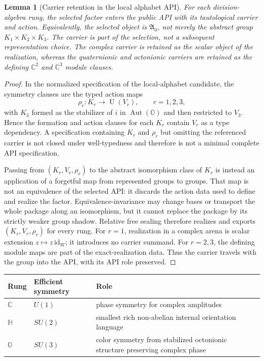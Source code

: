\documentclass[11pt]{article}
\theoremstyle{plain}
\newtheorem{lemma}[theorem]{Lemma}
\theoremstyle{definition}
\theoremstyle{remark}
\newcommand{\Aut}{\operatorname{Aut}}
\newcommand{\C}{\mathbb{C}}
\newcommand{\HH}{\mathbb{H}}
\newcommand{\OO}{\mathbb{O}}
\begin{document}
\begin{lemma}[Carrier retention in the local alphabet API]
For each division-algebra rung, the selected factor enters the public API
with its tautological carrier and action.  Equivalently, the selected object is
\(\mathfrak A_0\), not merely the abstract group
\(K_1\times K_2\times K_3\).  The carrier is part of the selection, not a
subsequent representation choice.  The complex carrier is retained as the
scalar object of the realization, whereas the quaternionic and octonionic
carriers are retained as the defining \(\C^2\) and \(\C^3\) module clauses.
\end{lemma}

\begin{proof}
In the normalized specification of the local-alphabet candidate, the symmetry
clauses are the typed action maps
\[
\rho_r:K_r\longrightarrow\operatorname{U}(V_r),\qquad r=1,2,3,
\]
with \(K_3\) formed as the stabilizer of \(i\) in \(\Aut(\OO)\) and then
restricted to \(V_3\).  Hence the formation and action clauses for each
\(K_r\) contain \(V_r\) as a type dependency.  A specification containing
\(K_r\) and \(\rho_r\) but omitting the referenced carrier is not closed under
well-typedness and therefore is not a minimal complete API specification.

Passing from \((K_r,V_r,\rho_r)\) to the abstract isomorphism class of \(K_r\)
is instead an application of a forgetful map from represented groups to
groups.  That map is not an equivalence of the selected API: it discards the
action data used to define and realize the factor.  Equivalence-invariance may
change bases or transport the whole package along an isomorphism, but it cannot
replace the package by its strictly weaker group shadow.  Relative free sealing
therefore realizes and exports \((K_r,V_r,\rho_r)\) for every rung.  For
\(r=1\), realization in a complex arena is scalar extension
\(z\mapsto z\,\mathrm{id}_W\); it introduces no carrier summand.  For
\(r=2,3\), the defining module maps are part of the exact-realization data.
Thus the carrier travels with the group into the API, with its API role
preserved.  \qedhere
\end{proof}

\begin{center}
\small
\begin{tabularx}{\textwidth}{l l Y}
\toprule
Rung & Efficient symmetry & Role \\
\midrule
\(\C\) & \(U(1)\) & phase symmetry for complex amplitudes \\
\(\HH\) & \(SU(2)\) & smallest rich non-abelian internal orientation language \\
\(\OO\) & \(SU(3)\) & color symmetry from stabilized octonionic structure preserving complex phase \\
\bottomrule
\end{tabularx}
\end{center}
\end{document}
